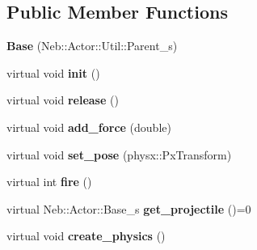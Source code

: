 \subsection*{Public Member Functions}
\begin{DoxyCompactItemize}
\item 
\hypertarget{classNeb_1_1Actor_1_1Actor_1_1Base_ac0c10d0555dc9d5e4bcc07f8159720df}{{\bfseries Base} (Neb\-::\-Actor\-::\-Util\-::\-Parent\-\_\-s)}\label{classNeb_1_1Actor_1_1Actor_1_1Base_ac0c10d0555dc9d5e4bcc07f8159720df}

\item 
\hypertarget{classNeb_1_1Actor_1_1Actor_1_1Base_a74b5eec0f243aa72bb9b642a353b3799}{virtual void {\bfseries init} ()}\label{classNeb_1_1Actor_1_1Actor_1_1Base_a74b5eec0f243aa72bb9b642a353b3799}

\item 
\hypertarget{classNeb_1_1Actor_1_1Actor_1_1Base_a1e7bc5de4a6b30c46a602a29c0face68}{virtual void {\bfseries release} ()}\label{classNeb_1_1Actor_1_1Actor_1_1Base_a1e7bc5de4a6b30c46a602a29c0face68}

\item 
\hypertarget{classNeb_1_1Actor_1_1Actor_1_1Base_a08e75988b2a5bb8dbcc279fce4d0c11d}{virtual void {\bfseries add\-\_\-force} (double)}\label{classNeb_1_1Actor_1_1Actor_1_1Base_a08e75988b2a5bb8dbcc279fce4d0c11d}

\item 
\hypertarget{classNeb_1_1Actor_1_1Actor_1_1Base_ac763835ed788dd6eac20dd72f3cf9169}{virtual void {\bfseries set\-\_\-pose} (physx\-::\-Px\-Transform)}\label{classNeb_1_1Actor_1_1Actor_1_1Base_ac763835ed788dd6eac20dd72f3cf9169}

\item 
\hypertarget{classNeb_1_1Actor_1_1Actor_1_1Base_a0ddaa61c1deaef77e07b898af73cb4af}{virtual int {\bfseries fire} ()}\label{classNeb_1_1Actor_1_1Actor_1_1Base_a0ddaa61c1deaef77e07b898af73cb4af}

\item 
\hypertarget{classNeb_1_1Actor_1_1Actor_1_1Base_a511a68cc306ce9e0b3417aa310eeae4f}{virtual Neb\-::\-Actor\-::\-Base\-\_\-s {\bfseries get\-\_\-projectile} ()=0}\label{classNeb_1_1Actor_1_1Actor_1_1Base_a511a68cc306ce9e0b3417aa310eeae4f}

\item 
\hypertarget{classNeb_1_1Actor_1_1Actor_1_1Base_ae514775e89a0c97b88c68a16dfba6796}{virtual void {\bfseries create\-\_\-physics} ()}\label{classNeb_1_1Actor_1_1Actor_1_1Base_ae514775e89a0c97b88c68a16dfba6796}


\end{DoxyCompactItemize}
